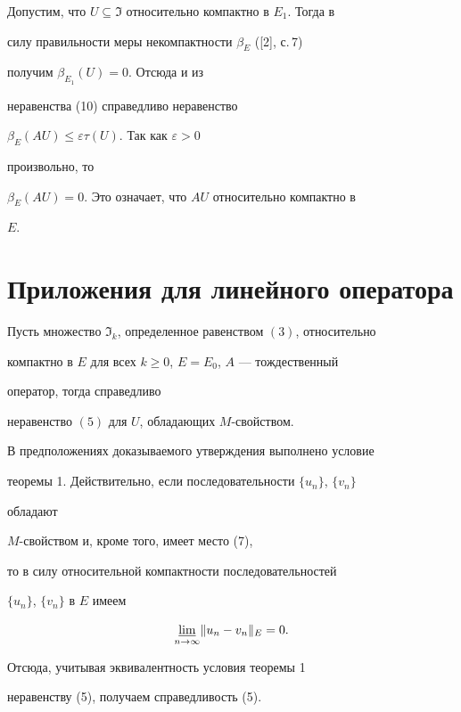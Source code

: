  


\begin{pf} 


Допустим, что $U\subseteq\Im$ относительно компактно в $E_1$. Тогда в  


силу правильности меры некомпактности $\beta_E$ ([2], с.\,7) 


получим $\beta_{E_1}(U)=0$. Отсюда и из  


неравенства (10) справедливо неравенство 


$\beta_E(A{}U)\le\varepsilon\tau(U)$. Так как $\varepsilon>0$ 


произвольно, то  


$\beta_E(A{}U)=0$. Это означает, что $A{}U$ относительно компактно в 


$E$. 


\end{pf} 


 


\section{Приложения для линейного оператора} 


 


\begin{prop} 


Пусть множество $\Im_k$, определенное равенством $(3)$, относительно  


компактно в $E$ для всех $k\ge0$, $E=E_0$, $A$ --- тождественный 


оператор, тогда справедливо  


неравенство $(5)$ для $U$, обладающих $M$-свойством.  


\end{prop} 


 


\begin{pf} 


В предположениях доказываемого утверждения выполнено условие  


теоремы 1. Действительно, если последовательности $\{u_n\}$, $\{v_n\}$ 


обладают 


$M$-свойством и, кроме того, имеет место (7), 


то в силу относительной компактности последовательностей 


$\{u_n\}$, $\{v_n\}$ в $E$ имеем 


$$ 


\down{n\to\infty}{\varliminf}\|u_n-v_n\|_E=0. 


$$ 


Отсюда, учитывая эквивалентность условия теоремы 1 


неравенству (5), получаем справедливость (5). 


\end{pf} 


